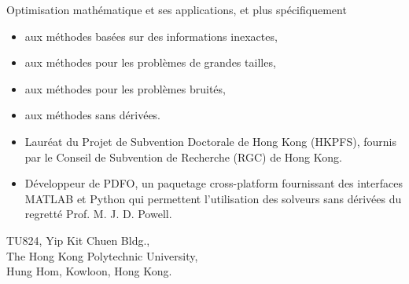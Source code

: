 Optimisation math\'{e}matique et ses applications, et plus sp\'{e}cifiquement
\begin{itemize}
    \item aux m\'{e}thodes bas\'{e}es sur des informations inexactes,
    \item aux m\'{e}thodes pour les probl\`{e}mes de grandes tailles,
    \item aux m\'{e}thodes pour les probl\`{e}mes bruit\'{e}s,
    \item aux m\'{e}thodes sans d\'{e}riv\'{e}es.
\end{itemize}


\cvtag{\LaTeX}


\begin{itemize}
    \item Laur\'{e}at du Projet de Subvention Doctorale de Hong Kong (HKPFS), fournis par le Conseil de Subvention de Recherche (RGC) de Hong Kong.
    \item D\'{e}veloppeur de PDFO, un paquetage cross-platform fournissant des interfaces MATLAB et Python qui permettent l'utilisation des solveurs sans dérivées du regretté Prof. M. J. D. Powell.
\end{itemize}




{TU824, Yip Kit Chuen Bldg., \\The Hong Kong Polytechnic University, \\ Hung Hom, Kowloon, Hong Kong.}

